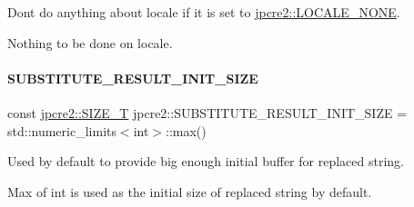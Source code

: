 Don\textquotesingle{}t do anything about locale if it is set to \hyperlink{namespacejpcre2_ad2236dcdcc14d580724b256ce7f168e5_ad2236dcdcc14d580724b256ce7f168e5}{jpcre2\+::\+L\+O\+C\+A\+L\+E\+\_\+\+N\+O\+NE}. 

Nothing to be done on locale. \hypertarget{namespacejpcre2_a80cb201f2e733137b22a8ed98465096a_a80cb201f2e733137b22a8ed98465096a}{}\label{namespacejpcre2_a80cb201f2e733137b22a8ed98465096a_a80cb201f2e733137b22a8ed98465096a} 
\paragraph{\texorpdfstring{S\+U\+B\+S\+T\+I\+T\+U\+T\+E\+\_\+\+R\+E\+S\+U\+L\+T\+\_\+\+I\+N\+I\+T\+\_\+\+S\+I\+ZE}{SUBSTITUTE\_RESULT\_INIT\_SIZE}}
{\footnotesize\ttfamily const \hyperlink{namespacejpcre2_a2aac465ddcb123560c7c8215dd69246c}{jpcre2\+::\+S\+I\+Z\+E\+\_\+T} jpcre2\+::\+S\+U\+B\+S\+T\+I\+T\+U\+T\+E\+\_\+\+R\+E\+S\+U\+L\+T\+\_\+\+I\+N\+I\+T\+\_\+\+S\+I\+ZE = std\+::numeric\+\_\+limits$<$int$>$\+::max()}



Used by default to provide big enough initial buffer for replaced string. 

Max of {\ttfamily int} is used as the initial size of replaced string by default. 
